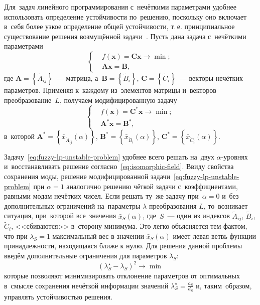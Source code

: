 Для~задач линейного программирования с~нечёткими параметрами удобнее использовать определение устойчивости по~решению, поскольку оно включает в~себя более узкое определение общей устойчивости, т.\,е. принципиальное существование решения возмущённой задачи~\cite{Vorontsov_VSTU}. Пусть дана задача с~нечёткими параметрами
\begin{equation*}
  \left\{ \begin{aligned}
    & f\left( \mathbf{x} \right)=\mathbf{Cx}\to \min;  \\ 
    & \mathbf{Ax}=\mathbf{B},
  \end{aligned} \right.
\end{equation*}
где $\mathbf{A}=\left\{ \tilde{A}_{ij} \right\}$~--- матрица, а~$\mathbf{B}=\left\{ \tilde{B}_i \right\}$, $\mathbf{C}=\left\{\tilde{C}_i \right\}$~--- векторы нечётких параметров. Применяя к~каждому из~элементов матрицы и~векторов преобразование~$L$, получаем модифицированную задачу
\begin{equation}
\label{eq:fuzzy-lp-unstable-problem}
  \left\{ \begin{aligned}
    & f\left( \mathbf{x} \right)={\mathbf{C}^{*}}\mathbf{x}\to \min;  \\ 
    & {\mathbf{A}^{*}}\mathbf{x}={\mathbf{B}}^{*},
  \end{aligned} \right.
\end{equation}
в~которой $\mathbf{A}^{*}=\left\{ \bar{x}_{\tilde{A}_{ij}}\left(\alpha \right) \right\}$, $\mathbf{B}^{*}=\left\{ \bar{x}_{\tilde{B}_i}\left(\alpha \right) \right\}$, $\mathbf{C}^{*}=\left\{ \bar{x}_{\tilde{C}_i}\left(\alpha \right) \right\}$.

Задачу~\eqref{eq:fuzzy-lp-unstable-problem} удобнее всего решать на~двух $\alpha$-уровнях и~восстанавливать решение согласно~\eqref{eq:isomorphic-field}. Ввиду свойства сохранения моды, решение модифицированной задачи~\eqref{eq:fuzzy-lp-unstable-problem} при $\alpha=1$ аналогично решению чёткой задачи с~коэффициентами, равными модам нечётких чисел. Если решать ту~же задачу при~$\alpha=0$ и~без дополнительных ограничений на~параметры $\lambda$ преобразования $L$, то~возникает ситуация, при~которой все~значения $\bar{x}_S\left(\alpha \right)$, где~$S$~--- один из индексов $\tilde A_{ij}$, $\tilde B_i$, $\tilde C_i$, <<сбиваются>> в~сторону минимума. Это легко объясняется тем фактом, что при $\lambda_S=1$ максимальный вес в значении $\bar{x}_S\left(\alpha \right)$ имеет левая ветвь функции принадлежности, находящаяся ближе к нулю. Для решения данной проблемы введём дополнительные ограничения для параметров $\lambda_S$:
\begin{equation}
\label{eq:lambda-minimization-criterion}
  {\left( \lambda_{S}^{\star}-\lambda_S \right)}^2\to \min
\end{equation}
которые позволяют минимизировать отклонение параметров от оптимальных в~смысле сохранения нечёткой информации значений $\displaystyle \lambda_{S}^{\star}=\frac{a_S}{d_S}$ и, таким~образом, управлять устойчивостью решения. 

